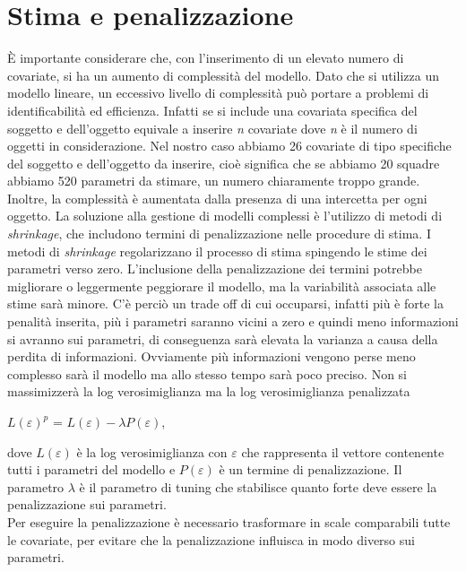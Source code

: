 \section{Stima e penalizzazione}
È importante considerare che, con l'inserimento di un elevato numero di covariate, si ha un aumento di complessità del modello. Dato che si utilizza un modello lineare, un eccessivo livello di complessità può portare a problemi di identificabilità ed efficienza. Infatti se si include una covariata specifica del soggetto e dell'oggetto equivale a inserire \emph{n} covariate dove \emph{n} è il numero di oggetti in considerazione. Nel nostro caso abbiamo 26 covariate di tipo specifiche del soggetto e dell'oggetto da inserire, cioè significa che se abbiamo 20 squadre abbiamo 520 parametri da stimare, un numero chiaramente troppo grande. Inoltre, la complessità è aumentata dalla presenza di una intercetta per ogni oggetto. La soluzione alla gestione di modelli complessi è l'utilizzo di metodi di \emph{shrinkage}, che includono termini di penalizzazione nelle procedure di stima. I metodi di \emph{shrinkage} \autocite{copas1983regression} regolarizzano il processo di stima spingendo le stime dei parametri verso zero.
L'inclusione della penalizzazione dei termini potrebbe migliorare o leggermente peggiorare il modello, ma la variabilità associata alle stime sarà minore. C'è perciò un trade off di cui occuparsi, infatti più è forte la penalità inserita, più i parametri saranno vicini a zero e quindi meno informazioni si avranno sui parametri, di conseguenza sarà elevata la varianza a causa della perdita di informazioni. Ovviamente più informazioni vengono perse meno complesso sarà il modello ma allo stesso tempo sarà poco preciso. Non si massimizzerà la log verosimiglianza ma la log verosimiglianza penalizzata 
\begin{center}
	$ L(\varepsilon)^{p}$ = $L(\varepsilon) - \lambda P(\varepsilon)$,
\end{center}
dove $L(\varepsilon)$ è la log verosimiglianza con $\varepsilon$ che rappresenta il vettore contenente tutti i parametri del modello e $P(\varepsilon)$ è un termine di penalizzazione. Il parametro $\lambda$ è il parametro di tuning che stabilisce quanto forte deve essere la penalizzazione sui parametri. \\
Per eseguire la penalizzazione è necessario trasformare in scale comparabili tutte le covariate, per evitare che la penalizzazione influisca in modo diverso sui parametri.\\
